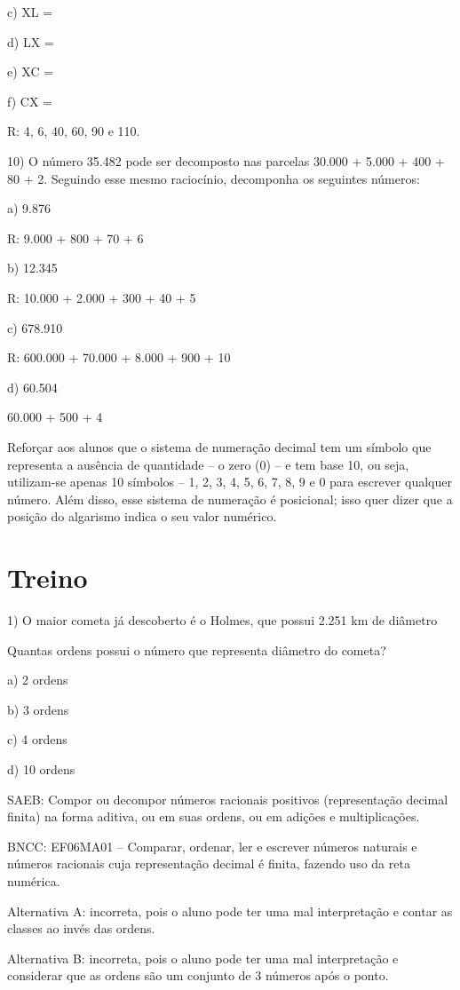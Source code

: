 c) XL =

d) LX =

e) XC =

f) CX =

R: 4, 6, 40, 60, 90 e 110.

10) O número 35.482 pode ser decomposto nas parcelas 30.000 + 5.000 +
400 + 80 + 2. Seguindo esse mesmo raciocínio, decomponha os seguintes
números:

a) 9.876

R: 9.000 + 800 + 70 + 6

b) 12.345

R: 10.000 + 2.000 + 300 + 40 + 5

c) 678.910

R: 600.000 + 70.000 + 8.000 + 900 + 10

d) 60.504

60.000 + 500 + 4

Reforçar aos alunos que o sistema de numeração decimal tem um símbolo
que representa a ausência de quantidade -- o zero (0) -- e tem base 10,
ou seja, utilizam-se apenas 10 símbolos -- 1, 2, 3, 4, 5, 6, 7, 8, 9 e 0
para escrever qualquer número. Além disso, esse sistema de numeração é
posicional; isso quer dizer que a posição do algarismo indica o seu
valor numérico.

\section{Treino}

1) O maior cometa já descoberto é o Holmes, que possui 2.251 km de
diâmetro

Quantas ordens possui o número que representa diâmetro do cometa?

a) 2 ordens

b) 3 ordens

c) 4 ordens

d) 10 ordens

SAEB: Compor ou decompor números racionais positivos (representação
decimal finita) na forma aditiva, ou em suas ordens, ou em adições e
multiplicações.

BNCC: EF06MA01 -- Comparar, ordenar, ler e escrever números naturais e
números racionais cuja representação decimal é finita, fazendo uso da
reta numérica.

Alternativa A: incorreta, pois o aluno pode ter uma mal interpretação e
contar as classes ao invés das ordens.

Alternativa B: incorreta, pois o aluno pode ter uma mal interpretação e
considerar que as ordens são um conjunto de 3 números após o ponto.

